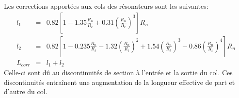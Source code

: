 \bigskip
Les corrections apportées aux cols des résonateurs sont les suivantes:
\begin{eqnarray*}
l_1 & = &  0.82 \left[ 1 - 1.35 \frac{R_n}{R_c} + 0.31 \left(\frac{R_n}{R_c} \right)^3  \right] R_n \\
l_2 & = &  0.82 \left[ 1 - 0.235 \frac{R_n}{R_t} - 1.32 \left( \frac{R_n}{R_t} \right)^2 +1.54 \left( \frac{R_n}{R_t}\right)^3 - 0.86 \left( \frac{R_n}{R_t}\right)^4  \right] R_n \\
L_{corr} & = &  l_1 + l_2
\end{eqnarray*}
Celle-ci sont dû au discontinuités de section à l'entrée et la sortie du col. Ces discontinuités entraînent une augmentation de la longueur effective de part et d'autre du col.